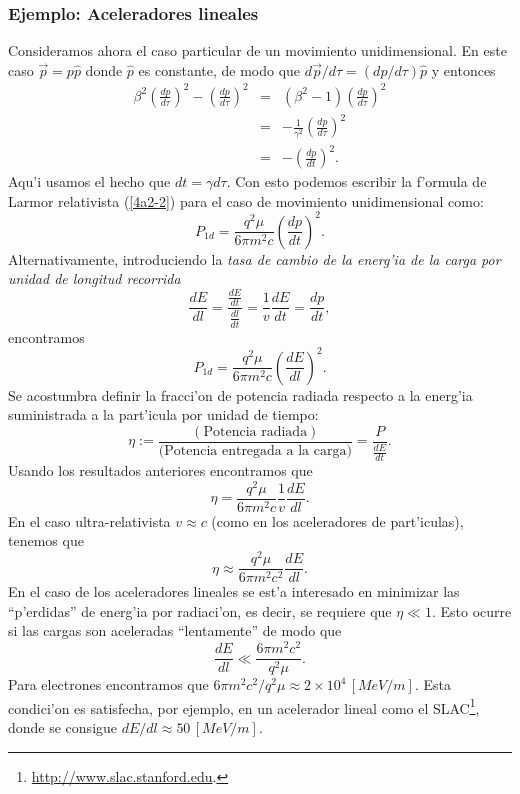 \subsubsection{Ejemplo: Aceleradores lineales}
Consideramos ahora el caso particular de un movimiento unidimensional. En este
caso $\vec{p}=p\hat{p}$ donde $\hat{p}$ es constante, de modo que
${d\vec{p}}/{d\tau}=({dp}/{d\tau})\hat{p}$ y entonces
\begin{eqnarray}
\beta^2\left(\frac{dp}{d\tau}\right)^2-\left( \frac{dp}{d\tau}\right)^2
&=&\left( \beta^2-1\right) \left(  \frac{dp}{d\tau}\right)^2\\
&=&-\frac{1}{\gamma^2} \left(  \frac{dp}{d\tau}\right)^2\\
&=&-\left(\frac{dp}{dt}\right)^2.
\end{eqnarray}
Aqu'i usamos el hecho que $dt=\gamma d\tau$. Con esto podemos escribir la f'ormula de Larmor relativista (\ref{4a2-2}) para el caso de movimiento unidimensional como:
\begin{equation}
\boxed{P_{1d}=\frac{q^2\mu}{6\pi m^2c}\left(  \frac{dp}{dt}\right)^2.}
\end{equation}
Alternativamente, introduciendo la \textit{tasa de cambio de la energ'ia de la
carga por unidad de longitud recorrida}
\begin{equation}
 \frac{dE}{dl}=\frac{\frac{dE}{dt}}{\frac{dl}{dt}}=\frac{1}{v}\frac{dE}{dt}
= \frac{dp}{dt},
\end{equation}
encontramos
\begin{equation}
\boxed{P_{1d}=\frac{q^2\mu}{6\pi m^2c}\left(  \frac{dE}{dl}\right)^2.}%
\end{equation}
Se acostumbra definir la fracci'on de potencia radiada respecto a la energ'ia
suministrada a la part'icula por unidad de tiempo:
\begin{equation}
\eta:=\frac{\left( \text{Potencia radiada}\right) }{\text{(Potencia entregada a la carga)}}=\frac{P}{\frac{dE}{dt}}.
\end{equation}
Usando los resultados anteriores encontramos que
\begin{equation}
\eta=\frac{q^2\mu}{6\pi m^2c}\frac{1}{v}\frac{dE}{dl}.
\end{equation}
En el caso ultra-relativista $v\approx c$ (como en los aceleradores de
part'iculas), tenemos que
\begin{equation}
\eta\approx\frac{q^2\mu}{6\pi m^2c^2}\frac{dE}{dl}.
\end{equation}
En el caso de los aceleradores lineales se est'a interesado en minimizar las
``p'erdidas'' de energ'ia por radiaci'on, es decir, se requiere que $\eta\ll 1$.
Esto ocurre si las cargas son aceleradas ``lentamente'' de modo que
\begin{equation}
\frac{dE}{dl}\ll \frac{6\pi m^2c^2}{q^2\mu}.
\end{equation}
Para electrones encontramos que ${6\pi m^2c^2}/{q^2\mu}\approx 2\times 10^4\, 
[MeV/m]$. Esta condici'on es satisfecha, por ejemplo, en un acelerador lineal como
el SLAC\footnote{\url{http://www.slac.stanford.edu}.}, donde se consigue
${dE}/{dl}\approx 50\, [MeV/m]$.

